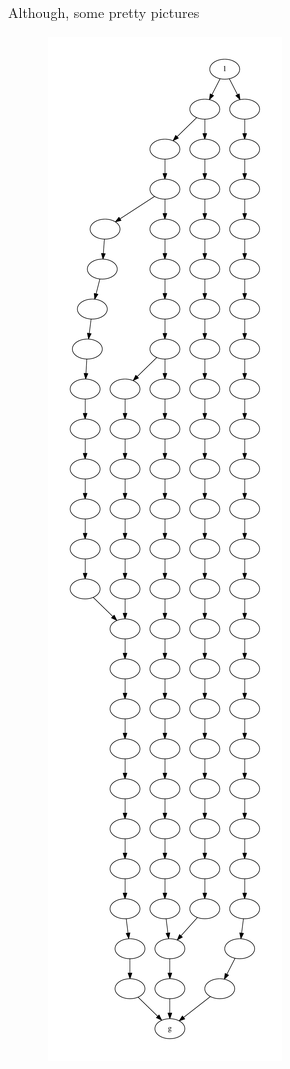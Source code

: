 \documentclass{beamer}
\begin{document}
{\begin{frame}{Although, some pretty pictures}
\begin{figure}
	\hfill
	\includegraphics[height=.9\textheight]{figure/patterns/pattern2}
	\hfill

\end{figure}
\end{frame}}
\end{document}
